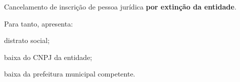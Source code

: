 \documentclass[openright, oneside, a4paper, article, brazil]{abntex2}
\begin{document}
\begin{framed}\small\raggedright
    \begin{minipage}[t]{\boxlarg}
        \raisebox{-2.2pt}{\fbox{\CheckBox[name=cancelamento,bordercolor=black]{\null}}}
    \end{minipage}%
    \begin{minipage}[t]{\linewidth-\boxlarg}
        Cancelamento de inscrição de pessoa jurídica \textbf{por extinção da entidade}.
        \vspace{\baselineskip}

        Para tanto, apresenta:
        \vspace{\baselineskip}

        \begin{minipage}[t]{\boxlarg}
            \hfill{\null}
        \end{minipage}%
        \begin{minipage}[t]{\linewidth-\boxlarg}%
%
                      \begin{minipage}[t]{\boxlarg}
                          \raisebox{-2.2pt}{\fbox{\CheckBox[name=distrato_social,bordercolor=black]{\null}}}
                      \end{minipage}%
                      \begin{minipage}[t]{\linewidth-\boxlarg}
                          distrato social;
                     \end{minipage}\vspace{0.5ex}
                      \begin{minipage}[t]{\boxlarg}
                          \raisebox{-2.2pt}{\fbox{\CheckBox[name=baixa_cnpj,bordercolor=black]{\null}}}
                      \end{minipage}%
                      \begin{minipage}[t]{\linewidth-\boxlarg}
                          baixa do CNPJ da entidade;
                      \end{minipage}\vspace{0.5ex}
                      \begin{minipage}[t]{\boxlarg}
                          \raisebox{-2.2pt}{\fbox{\CheckBox[name=copia_baixa_prefeitura,bordercolor=black]{\null}}}
                      \end{minipage}%
                      \begin{minipage}[t]{\linewidth-\boxlarg}
                          baixa da prefeitura municipal competente.
                      \end{minipage}
                      \vspace{-0.1\baselineskip}


\end{minipage}
\end{minipage}
\end{framed}
\end{document}
